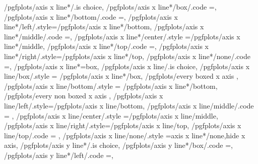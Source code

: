 {%
	/pgfplots/axis x line*/.is choice,
	/pgfplots/axis x line*/box/.code	={\def\pgfplots@xaxislinesnum{0}\def\pgfplots@xtickposnum{0}},
	/pgfplots/axis x line*/bottom/.code	={\def\pgfplots@xaxislinesnum{1}\def\pgfplots@xtickposnum{1}\let\pgfplots@xticklabel@pos\pgfutil@empty},
	/pgfplots/axis x line*/left/.style={/pgfplots/axis x line*/bottom},
	/pgfplots/axis x line*/middle/.code	={\def\pgfplots@xaxislinesnum{2}\def\pgfplots@xtickposnum{2}\let\pgfplots@xticklabel@pos\pgfutil@empty},
	/pgfplots/axis x line*/center/.style	={/pgfplots/axis x line*/middle},
	/pgfplots/axis x line*/top/.code	={\def\pgfplots@xaxislinesnum{3}\def\pgfplots@xtickposnum{3}\let\pgfplots@xticklabel@pos\pgfutil@empty},
	/pgfplots/axis x line*/right/.style={/pgfplots/axis x line*/top},
	/pgfplots/axis x line*/none/.code	={\def\pgfplots@xaxislinesnum{4}\def\pgfplots@xtickposnum{4}\let\pgfplots@xticklabel@pos\pgfutil@empty},
	/pgfplots/axis x line*=box,
	/pgfplots/axis x line/.is choice,
	/pgfplots/axis x line/box/.style	={
		/pgfplots/axis x line*/box,
		/pgfplots/every boxed x axis
	},
	/pgfplots/axis x line/bottom/.style	={
		/pgfplots/axis x line*/bottom,
		/pgfplots/every non boxed x axis
	},
	/pgfplots/axis x line/left/.style={/pgfplots/axis x line/bottom},%
	/pgfplots/axis x line/middle/.code	={%
		\ifnum{} %
		\else
		\fi
	},
	/pgfplots/axis x line/center/.style	={/pgfplots/axis x line/middle},
	/pgfplots/axis x line/right/.style={/pgfplots/axis x line/top},%
	/pgfplots/axis x line/top/.code	={
		\ifnum{} %
		\fi
	},
	/pgfplots/axis x line/none/.style	={axis x line*/none,hide x axis},
	/pgfplots/axis y line*/.is choice,
	/pgfplots/axis y line*/box/.code	={\def\pgfplots@yaxislinesnum{0}\def\pgfplots@ytickposnum{0}},
	/pgfplots/axis y line*/left/.code	={\def\pgfplots@yaxislinesnum{1}\def\pgfplots@ytickposnum{1}\let\pgfplots@yticklabel@pos\pgfutil@empty},
}
